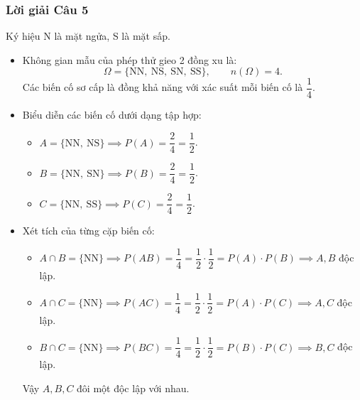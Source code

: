\documentclass[12pt,a4paper]{article}
\theoremstyle{definition}
\begin{document}
\subsubsection*{Lời giải Câu 5}
Ký hiệu N là mặt ngửa, S là mặt sấp.
\begin{itemize}
    \item Không gian mẫu của phép thử gieo 2 đồng xu là:
    \[
    \Omega = \{\text{NN},\ \text{NS},\ \text{SN},\ \text{SS}\}, \qquad n(\Omega) = 4.
    \]
    Các biến cố sơ cấp là đồng khả năng với xác suất mỗi biến cố là $\dfrac{1}{4}$.
    \item Biểu diễn các biến cố dưới dạng tập hợp:
    \begin{itemize}
        \item $A = \{\text{NN},\ \text{NS}\} \implies P(A) = \dfrac{2}{4} = \dfrac{1}{2}$.
        \item $B = \{\text{NN},\ \text{SN}\} \implies P(B) = \dfrac{2}{4} = \dfrac{1}{2}$.
        \item $C = \{\text{NN},\ \text{SS}\} \implies P(C) = \dfrac{2}{4} = \dfrac{1}{2}$.
    \end{itemize}
    \item Xét tích của từng cặp biến cố:
    \begin{itemize}
        \item $A \cap B = \{\text{NN}\} \implies P(AB) = \dfrac{1}{4} = \dfrac{1}{2} \cdot \dfrac{1}{2} = P(A) \cdot P(B) \implies A, B$ độc lập.
        \item $A \cap C = \{\text{NN}\} \implies P(AC) = \dfrac{1}{4} = \dfrac{1}{2} \cdot \dfrac{1}{2} = P(A) \cdot P(C) \implies A, C$ độc lập.
        \item $B \cap C = \{\text{NN}\} \implies P(BC) = \dfrac{1}{4} = \dfrac{1}{2} \cdot \dfrac{1}{2} = P(B) \cdot P(C) \implies B, C$ độc lập.
    \end{itemize}
    Vậy $A, B, C$ đôi một độc lập với nhau.
\end{itemize}
\end{document}
